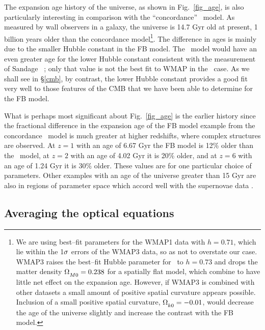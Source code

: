 \documentclass[12pt]{article}
\begin{document}
The expansion age history of the universe, as shown in Fig.~\ref{fig_age},
is also particularly interesting in comparison with the ``concordance''
\LCDM\ model. As measured by wall observers in a galaxy, the universe is
14.7 Gyr old at present, 1 billion years older than the concordance
model\footnote{We are using best--fit parameters for the WMAP1 data with
$h=0.71$, which lie within the 1$\sigma$ errors of the WMAP3 data, so as not to
overstate our case. WMAP3 raises the best--fit Hubble parameter for \LCDM\
to $h=0.73$ and drops the matter density $\OmMn=0.238$ for a spatially flat
model, which combine to have little net effect on the expansion age. However,
if WMAP3 is combined with other datasets a small amount of positive spatial
curvature appears possible. Inclusion of a small positive spatial curvature,
$\Omega\Z{k0}=-0.01$, would decrease the age of the universe
slightly and increase the contrast with the FB model.}.
The difference in ages is mainly due to the smaller Hubble constant in
the FB model. The \LCDM\ model would have an even greater age for the lower
Hubble constant consistent with the measurement of Sandage \etal\
\cite{Sandage}; only that value is not the best fit to WMAP in the
\LCDM\ case. As we shall see in \S\ref{cmb}, by contrast, the lower Hubble
constant provides a good fit very well to those features of the CMB that
we have been able to determine for the FB model.

What is perhaps most significant about Fig.\ \ref{fig_age} is the earlier
history since the fractional difference in the expansion age of the FB model
example from the concordance \LCDM\ model is much greater at higher redshifts,
where complex structures are observed. At $z=1$ with an age of 6.67 Gyr the
FB model is 12\% older than the \LCDM\ model, at $z=2$ with an age of 4.02
Gyr it is 20\% older, and at $z=6$ with an age of 1.24 Gyr it is 30\% older.
These values are for one particular choice of parameters. Other examples with
an age of the universe greater than 15 Gyr are also in regions of parameter
space which accord well with the supernovae data \cite{paper2}.

\subsection{Averaging the optical equations\label{nullav}}
\end{document}
